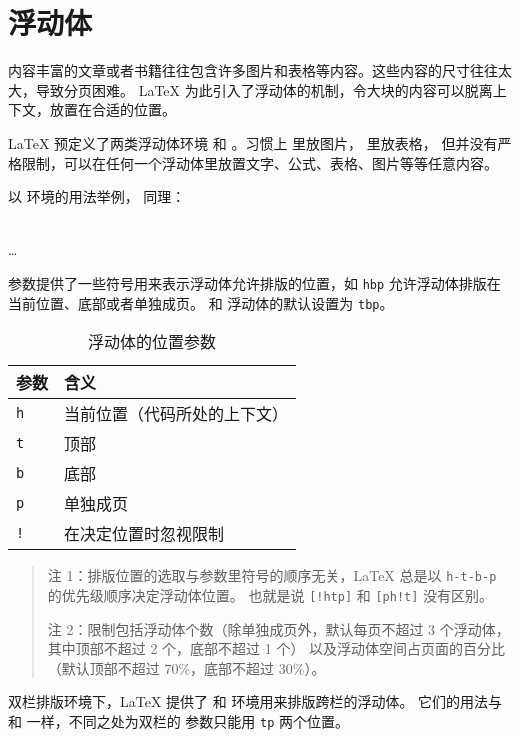 \section{浮动体}\label{sec:float}

内容丰富的文章或者书籍往往包含许多图片和表格等内容。这些内容的尺寸往往太大，导致分页困难。
\LaTeX{} 为此引入了浮动体的机制，令大块的内容可以脱离上下文，放置在合适的位置。

\LaTeX{} 预定义了两类浮动体环境  和 。习惯上  里放图片， 里放表格，
但并没有严格限制，可以在任何一个浮动体里放置文字、公式、表格、图片等等任意内容。

以  环境的用法举例， 同理：
\begin{command}
 \\
\ldots \\
\end{command}

 参数提供了一些符号用来表示浮动体允许排版的位置，如 \texttt{hbp} 允许浮动体排版在当前位置、底部或者单独成页。
 和  浮动体的默认设置为 \texttt{tbp}。
\begin{table}[htp]
\centering
\caption{浮动体的位置参数}\label{tbl:float-placement}
\begin{tabular}{*{2}{l}}
 \hline
 \textbf{参数} & \textbf{含义} \\
 \hline
 \texttt{h} & 当前位置（代码所处的上下文） \\
 \texttt{t} & 顶部 \\
 \texttt{b} & 底部 \\
 \texttt{p} & 单独成页 \\
 \texttt{!} & 在决定位置时忽视限制 \\
 \hline
\end{tabular}
\begin{quote}\footnotesize
注 1：排版位置的选取与参数里符号的顺序无关，\LaTeX{} 总是以 \texttt{h-t-b-p} 的优先级顺序决定浮动体位置。
也就是说 \texttt{[!htp]} 和 \texttt{[ph!t]} 没有区别。\par
注 2：限制包括浮动体个数（除单独成页外，默认每页不超过 3 个浮动体，其中顶部不超过 2 个，底部不超过 1 个）
以及浮动体空间占页面的百分比（默认顶部不超过 70\%，底部不超过 30\%）。
\end{quote}
\end{table}

双栏排版环境下，\LaTeX{} 提供了  和  环境用来排版跨栏的浮动体。
它们的用法与  和  一样，不同之处为双栏的  参数只能用 \texttt{tp} 两个位置。


